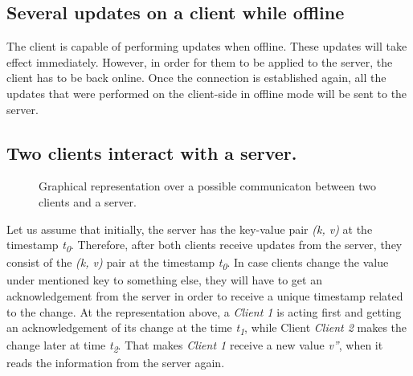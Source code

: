 \subsection*{Several updates on a client while offline}

The client is capable of performing updates when offline. These updates will take effect immediately. However, in order for them to be applied to the server, the client has to be back online. Once the connection is established again, all the updates that were performed on the client-side in offline mode will be sent to the server.

\subsection{Two clients interact with a server.}

\begin{figure}[!htb]
    \setlength{\fboxsep}{4pt}%
    \setlength{\fboxrule}{1pt}%
    \caption{Graphical representation over a possible communicaton between two clients and a server.}
    \label{fig:design4}
\end{figure}

Let us assume that initially, the server has the key-value pair \textit{(k, v)} at the timestamp \textit{t\textsubscript{0}}. Therefore, after both clients receive updates from the server, they consist of the \textit{(k, v)} pair at the timestamp \textit{t\textsubscript{0}}. In case clients change the value under mentioned key to something else, they will have to get an acknowledgement from the server in order to receive a unique timestamp related to the change. At the representation above, a \textit{Client 1} is acting first and getting an acknowledgement of its change at the time \textit{t\textsubscript{1}}, while Client \textit{Client 2} makes the change later at time \textit{t\textsubscript{2}}. That makes \textit{Client 1} receive a new value \textit{v''}, when it reads the information from the server again.

